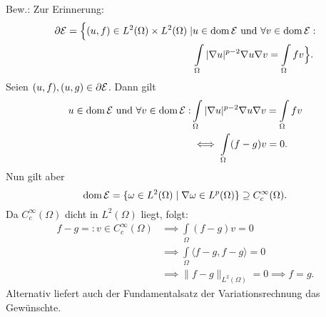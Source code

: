 \begin{beispiel}
	Bew.: Zur Erinnerung:
	\begin{align*}
		\partial\mathcal{E} = \Big\{(u,f) \in L^2(\Omega)\times L^2(\Omega) \mid & u \in \operatorname{dom} \mathcal{E} \text{ und } \forall v \in \operatorname{dom}\mathcal{E} : \\
		& \int\limits_{\Omega} |\nabla u|^{p-2}\nabla u \nabla v = \int\limits_{\Omega} fv\Big\}.
	\end{align*}
	Seien $(u,f),(u,g) \in \partial\mathcal{E}$. Dann gilt 
	\begin{align*}
		u \in \operatorname{dom} \mathcal{E} \text{ und } \forall v \in \operatorname{dom}\mathcal{E} : &\int\limits_{\Omega} |\nabla u|^{p-2}\nabla u \nabla v = \int\limits_{\Omega} fv\\
		& \iff \int\limits_{\Omega}(f-g)v = 0.
	\end{align*}
	Nun gilt aber
	$$ \operatorname{dom}\mathcal{E} = \{\omega \in L^2(\Omega) \mid \nabla \omega \in L^p(\Omega)\} \supseteq C_c^\infty(\Omega).$$
	Da $C_c^\infty(\Omega)$ dicht in $L^2(\Omega)$ liegt, folgt: 
	\begin{align*}
		f-g =: v \in C_c^\infty(\Omega) & \implies \int\limits_\Omega(f-g)v = 0\\
		& \implies \int\limits_\Omega\langle f-g, f-g \rangle = 0\\
		& \implies \| f-g \|_{L^2(\Omega)} = 0 \implies f = g.
	\end{align*}
	Alternativ liefert auch der Fundamentalsatz der Variationsrechnung das Gewünschte.
\end{beispiel}


